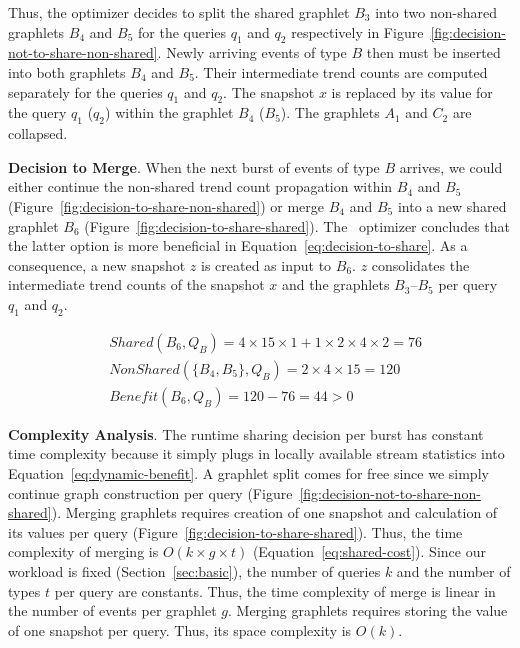 Thus, the optimizer decides to split the shared graph\-let $B_3$ into two non-shared graphlets $B_4$ and $B_5$ for the queries $q_1$ and $q_2$ respectively in Figure~\ref{fig:decision-not-to-share-non-shared}. Newly arriving events of type $B$ then must be inserted into both graphlets $B_4$ and $B_5$. Their intermediate trend counts are computed separately for the queries $q_1$ and $q_2$. The snapshot $x$ is replaced by its value for the query $q_1$ ($q_2$) within the graphlet $B_4$ ($B_5$). The graphlets $A_1$ and $C_2$ are collapsed.

\textbf{Decision to Merge}.
%
When the next burst of events of type $B$ arrives, we could either continue the non-shared trend count propagation within $B_4$ and $B_5$ (Figure~\ref{fig:decision-to-share-non-shared}) or merge $B_4$ and $B_5$ into a new shared graphlet $B_6$ (Figure~\ref{fig:decision-to-share-shared}). The \app\ optimizer concludes that the latter option is more beneficial in Equation~\ref{eq:decision-to-share}. As a consequence, a new snapshot $z$ is created as input to $B_6$. $z$ consolidates the intermediate trend counts of the snapshot $x$ and the graphlets $B_3$--$B_5$ per query $q_1$ and $q_2$.

\vspace{-4mm}
\begin{align}
&\mathit{Shared}(B_6,Q_B) 
= 4 \times 15 \times 1 
+ 1 \times 2 \times 4 \times 2 
= 76
\nonumber\\
&\mathit{NonShared}(\{B_4,B_5\},Q_B) 
= 2 \times 4 \times 15 = 120 
\nonumber\\
&\mathit{Benefit}(B_6,Q_B)
= 120 - 76 = 44 > 0
\label{eq:decision-to-share}
\end{align}



\textbf{Complexity Analysis}.
%
The runtime sharing decision per burst has constant time complexity because it simply plugs in locally available stream statistics into Equation~\ref{eq:dynamic-benefit}.
%
A graphlet split comes for free since we simply continue graph construction per query (Figure~\ref{fig:decision-not-to-share-non-shared}).
%
Merging graphlets requires creation of one snapshot and calculation of its values per query (Figure~\ref{fig:decision-to-share-shared}). Thus, the time complexity of merging is $O(k \times g \times t)$ (Equation~\ref{eq:shared-cost}).
Since our workload is fixed (Section~\ref{sec:basic}), the number of queries $k$ and the number of types $t$ per query are constants. Thus, the time complexity of merge is linear in the number of events per graphlet $g$.
Merging graphlets  requires storing the value of one snapshot per query. Thus, its space complexity is $O(k)$.

